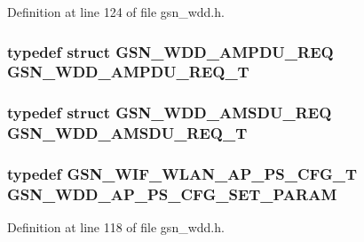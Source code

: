 Definition at line 124 of file gsn\_\-wdd.h.

\hypertarget{a00603_af3b1b212e8f1221473592d765ef07711}{
\subsubsection[{GSN\_\-WDD\_\-AMPDU\_\-REQ\_\-T}]{\setlength{\rightskip}{0pt plus 5cm}typedef struct {\bf GSN\_\-WDD\_\-AMPDU\_\-REQ}  {\bf GSN\_\-WDD\_\-AMPDU\_\-REQ\_\-T}}}
\label{a00603_af3b1b212e8f1221473592d765ef07711}
\hypertarget{a00603_a140aa60fdc6ee0c2ef0ad0e615453b01}{
\subsubsection[{GSN\_\-WDD\_\-AMSDU\_\-REQ\_\-T}]{\setlength{\rightskip}{0pt plus 5cm}typedef struct {\bf GSN\_\-WDD\_\-AMSDU\_\-REQ}  {\bf GSN\_\-WDD\_\-AMSDU\_\-REQ\_\-T}}}
\label{a00603_a140aa60fdc6ee0c2ef0ad0e615453b01}
\hypertarget{a00603_a7dc57c477301af9fb7424aa7cd500899}{
\subsubsection[{GSN\_\-WDD\_\-AP\_\-PS\_\-CFG\_\-SET\_\-PARAM}]{\setlength{\rightskip}{0pt plus 5cm}typedef {\bf GSN\_\-WIF\_\-WLAN\_\-AP\_\-PS\_\-CFG\_\-T} {\bf GSN\_\-WDD\_\-AP\_\-PS\_\-CFG\_\-SET\_\-PARAM}}}
\label{a00603_a7dc57c477301af9fb7424aa7cd500899}


Definition at line 118 of file gsn\_\-wdd.h.

